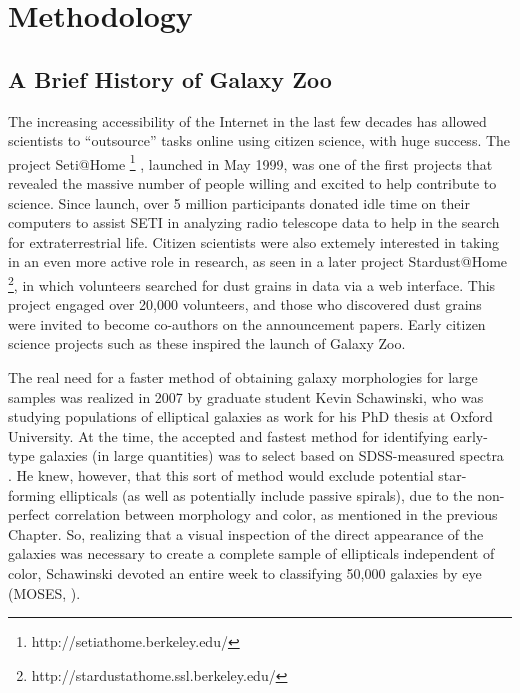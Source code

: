 \chapter{Methodology}
\label{chap:methodology}

\section{A Brief History of Galaxy Zoo}

The increasing accessibility of the Internet in the last few decades has allowed scientists to ``outsource'' tasks online using citizen science, with huge success. The project Seti@Home \footnote{http://setiathome.berkeley.edu/} \citep{Anderson2002}, launched in May 1999, was one of the first projects that revealed the massive number of people willing and excited to help contribute to science. Since launch, over 5 million participants donated idle time on their computers to assist SETI in analyzing radio telescope data to help in the search for extraterrestrial life. Citizen scientists were also extemely interested in taking in an even more active role in research, as seen in a later project Stardust@Home \footnote{http://stardustathome.ssl.berkeley.edu/}, in which volunteers searched for dust grains in data via a web interface. This project engaged over 20,000 volunteers, and those who discovered dust grains were invited to become co-authors on the announcement papers. Early citizen science projects such as these inspired the launch of Galaxy Zoo.

The real need for a faster method of obtaining galaxy morphologies for large samples was realized in 2007 by graduate student Kevin Schawinski, who was studying populations of elliptical galaxies as work for his PhD thesis at Oxford University. At the time, the accepted and fastest method for identifying early-type galaxies (in large quantities) was to select based on SDSS-measured spectra \citep{Bernardi2003}. He knew, however, that this sort of method would exclude potential star-forming ellipticals (as well as potentially include passive spirals), due to the non-perfect correlation between morphology and color, as mentioned in the previous Chapter. So, realizing that a visual inspection of the direct appearance of the galaxies was necessary to create a complete sample of ellipticals independent of color, Schawinski devoted an entire week to classifying 50,000 galaxies by eye (MOSES, \citet{Schawinski2007}). 

